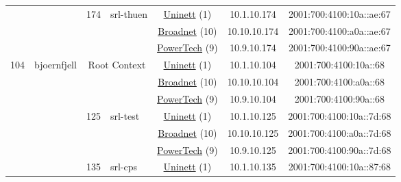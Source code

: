 \begin{small}
\begin{center}
\begin{longtable}{|c|c|c|c|c|c|c|c|}
  &  & \multirow{3}{*}{\tiny{174}} & \multicolumn{1}{|l|}{\multirow{3}{*}{\tiny{srl-thuen}}} & \multicolumn{2}{|c|}{\tiny{\href{https://www.uninett.no}{Uninett} (1)}} & \tiny{10.1.10.174} & \tiny{2001:700:4100:10a::ae:67} \\* \cline{5-5}\cline{6-6}\cline{7-7}\cline{8-8}
  &  &  &  & \multicolumn{2}{|c|}{\tiny{\href{https://www.broadnet.no}{Broadnet} (10)}} & \tiny{10.10.10.174} & \tiny{2001:700:4100:a0a::ae:67} \\* \cline{5-5}\cline{6-6}\cline{7-7}\cline{8-8}
  &  &  &  & \multicolumn{2}{|c|}{\tiny{\href{http://www.powertech.no}{PowerTech} (9)}} & \tiny{10.9.10.174} & \tiny{2001:700:4100:90a::ae:67} \\ \hline
 \multirow{33}{*}{\tiny{104}} & \multicolumn{1}{|l|}{\multirow{33}{*}{\tiny{bjoernfjell}}} & \multicolumn{2}{|c|}{\multirow{3}{*}{\tiny{Root Context}}} & \multicolumn{2}{|c|}{\tiny{\href{https://www.uninett.no}{Uninett} (1)}} & \tiny{10.1.10.104} & \tiny{2001:700:4100:10a::68} \\* \cline{5-5}\cline{6-6}\cline{7-7}\cline{8-8}
  &  & \multicolumn{2}{|c|}{} & \multicolumn{2}{|c|}{\tiny{\href{https://www.broadnet.no}{Broadnet} (10)}} & \tiny{10.10.10.104} & \tiny{2001:700:4100:a0a::68} \\* \cline{5-5}\cline{6-6}\cline{7-7}\cline{8-8}
  &  & \multicolumn{2}{|c|}{} & \multicolumn{2}{|c|}{\tiny{\href{http://www.powertech.no}{PowerTech} (9)}} & \tiny{10.9.10.104} & \tiny{2001:700:4100:90a::68} \\* \cline{3-3}\cline{4-4}\cline{5-5}\cline{6-6}\cline{7-7}\cline{8-8}
  &  & \multirow{3}{*}{\tiny{125}} & \multicolumn{1}{|l|}{\multirow{3}{*}{\tiny{srl-test}}} & \multicolumn{2}{|c|}{\tiny{\href{https://www.uninett.no}{Uninett} (1)}} & \tiny{10.1.10.125} & \tiny{2001:700:4100:10a::7d:68} \\* \cline{5-5}\cline{6-6}\cline{7-7}\cline{8-8}
  &  &  &  & \multicolumn{2}{|c|}{\tiny{\href{https://www.broadnet.no}{Broadnet} (10)}} & \tiny{10.10.10.125} & \tiny{2001:700:4100:a0a::7d:68} \\* \cline{5-5}\cline{6-6}\cline{7-7}\cline{8-8}
  &  &  &  & \multicolumn{2}{|c|}{\tiny{\href{http://www.powertech.no}{PowerTech} (9)}} & \tiny{10.9.10.125} & \tiny{2001:700:4100:90a::7d:68} \\* \cline{3-3}\cline{4-4}\cline{5-5}\cline{6-6}\cline{7-7}\cline{8-8}
  &  & \multirow{3}{*}{\tiny{135}} & \multicolumn{1}{|l|}{\multirow{3}{*}{\tiny{srl-cps}}} & \multicolumn{2}{|c|}{\tiny{\href{https://www.uninett.no}{Uninett} (1)}} & \tiny{10.1.10.135} & \tiny{2001:700:4100:10a::87:68} \\* \cline{5-5}\cline{6-6}\cline{7-7}\cline{8-8}

\end{longtable}
\end{center}
\end{small}
